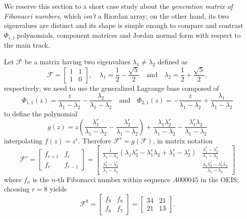 
We reserve this section to a short case study about the \textit{generation
matrix of Fibonacci numbers}, which \textit{isn't} a Riordan array; on the
other hand, its two eigenvalues are distinct and its shape is simple enough to
compare and contrast $\Phi_{i,j}$ polynomials, component matrices and Jordan
normal form with respect to the main track.

Let $\mathcal{F}$ be a matrix having two eigenvalues $\lambda_{1}\neq
\lambda_{2}$ defined as
\begin{displaymath}
\mathcal{F} = \left[\begin{matrix}1 & 1\\1 & 0\end{matrix}\right],
\quad  \lambda_{1} =  \frac{1}{2}- \frac{\sqrt{5}}{2}
\quad\text{and}\quad \lambda_{2} = \frac{1}{2} + \frac{\sqrt{5}}{2},
\end{displaymath}
respectively; we need to use the generalized Lagrange base composed of
\begin{displaymath}
\Phi_{ 1, 1 }{\left (z \right )} = \frac{z}{\lambda_{1} - \lambda_{2}} - \frac{\lambda_{2}}{\lambda_{1} - \lambda_{2}} 
\quad\text{and}\quad \Phi_{ 2, 1 }{\left (z \right )} = - \frac{z}{\lambda_{1} - \lambda_{2}} + \frac{\lambda_{1}}{\lambda_{1} - \lambda_{2}}
\end{displaymath}
to define the polynomial
\begin{displaymath}
g{\left (z \right )} = z \left(\frac{\lambda_{1}^{r}}{\lambda_{1} - \lambda_{2}} - \frac{\lambda_{2}^{r}}{\lambda_{1} - \lambda_{2}}\right) + \frac{\lambda_{1} \lambda_{2}^{r}}{\lambda_{1} - \lambda_{2}} - \frac{\lambda_{1}^{r} \lambda_{2}}{\lambda_{1} - \lambda_{2}}
\end{displaymath}
interpolating $f(z)=z^{r}$. Therefore $\mathcal{F}^{r} = g(\mathcal{F})$, in
matrix notation
\begin{displaymath}
\mathcal{F}^{r} = \left[\begin{matrix}f_{r+1} & f_{r}\\f_{r} & f_{r-1}\end{matrix}\right] =\left[\begin{matrix}\frac{1}{\lambda_{1} - \lambda_{2}} \left(\lambda_{1} \lambda_{2}^{r} - \lambda_{1}^{r} \lambda_{2} + \lambda_{1}^{r} - \lambda_{2}^{r}\right) & \frac{\lambda_{1}^{r} - \lambda_{2}^{r}}{\lambda_{1} - \lambda_{2}}\\\frac{\lambda_{1}^{r} - \lambda_{2}^{r}}{\lambda_{1} - \lambda_{2}} & \frac{\lambda_{1} \lambda_{2}^{r} - \lambda_{1}^{r} \lambda_{2}}{\lambda_{1} - \lambda_{2}}\end{matrix}\right]
\end{displaymath}
where $f_{n}$ is the $n$-th Fibonacci number within sequence $A000045$ in the
OEIS; choosing $r=8$ yields
\begin{displaymath}
\mathcal{F}^{8} = \left[\begin{matrix}f_{9} & f_{8}\\f_{8} & f_{7}\end{matrix}\right] = \left[\begin{matrix}34 & 21\\21 & 13\end{matrix}\right].
\end{displaymath}

